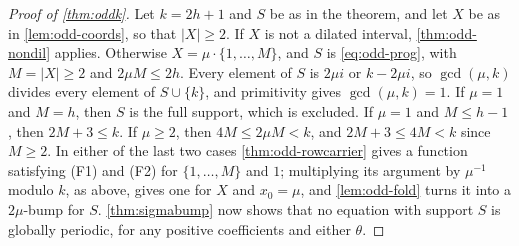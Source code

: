 \begin{proof}[Proof of \autoref{thm:oddk}]
Let $k=2h+1$ and $S$ be as in the theorem, and let $X$ be as in
\autoref{lem:odd-coords}, so that $|X|\ge2$. If $X$ is not a dilated interval,
\autoref{thm:odd-nondil} applies. Otherwise $X=\mu\cdot\{1,\dots,M\}$, and
$S$ is \eqref{eq:odd-prog}, with $M=|X|\ge2$ and $2\mu M\le2h$. Every element
of $S$ is $2\mu i$ or $k-2\mu i$, so $\gcd(\mu,k)$ divides every element of
$S\cup\{k\}$, and primitivity gives $\gcd(\mu,k)=1$. If $\mu=1$ and $M=h$,
then $S$ is the full support, which is excluded. If $\mu=1$ and $M\le h-1$,
then $2M+3\le k$. If $\mu\ge2$, then $4M\le2\mu M<k$, and $2M+3\le4M<k$ since
$M\ge2$. In either of the last two cases \autoref{thm:odd-rowcarrier} gives a
function satisfying (F1) and (F2) for $\{1,\dots,M\}$ and $1$; multiplying
its argument by $\mu^{-1}$ modulo $k$, as above, gives one for $X$ and
$x_0=\mu$, and \autoref{lem:odd-fold} turns it into a $2\mu$-bump for $S$.
\autoref{thm:sigmabump} now shows that no equation with support $S$ is
globally periodic, for any positive coefficients and either $\theta$.
\end{proof}
